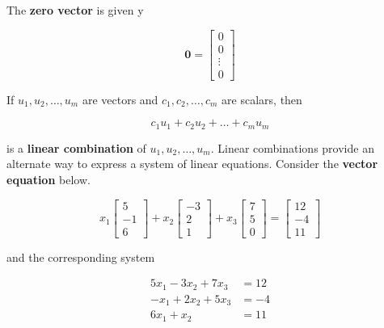         The \textbf{zero vector} is given y

        \[
            \mathbf{0} =
            \begin{bmatrix}
                0 \\
                0 \\
                \vdots \\
                0
            \end{bmatrix}
        \]

        If $u_1, u_2, \dots, u_m$ are vectors and $c_1, c_2, \dots, c_m$ are scalars, then

        \[
            c_1 u_1 + c_2 u_2 + \dots + c_m u_m
        \]

        is a \textbf{linear combination} of $u_1, u_2, \dots, u_m$. Linear combinations provide an alternate way to express a system of linear equations. Consider the \textbf{vector equation} below.

        \[
            x_1
            \begin{bmatrix}
                5 \\
                -1 \\
                6
            \end{bmatrix}
            + x_2
            \begin{bmatrix}
                -3 \\
                2 \\
                1
            \end{bmatrix}
            +x_3
            \begin{bmatrix}
                7 \\
                5 \\
                0
            \end{bmatrix}
            =
            \begin{bmatrix}
                12 \\
                -4 \\
                11
            \end{bmatrix}
        \]

        and the corresponding system

        \begin{align*}
            5x_1 - 3x_2 + 7x_3  &= 12 \\
            -x_1 + 2x_2 + 5x_3  &= -4 \\
            6x_1 + x_2          &= 11
        \end{align*}


